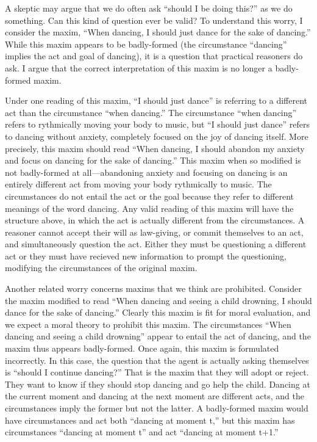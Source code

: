 \begin{isabellebody}
\begin{isamarkuptext}
A skeptic may argue that we do often ask ``should I be doing this?'' as we do something. 
Can this kind of question ever be valid? To understand this worry, I consider the maxim, 
``When dancing, I should just dance for the sake of dancing.'' While this maxim appears to be badly-formed (the 
circumstance ``dancing'' implies the act and goal of dancing), it is a question that practical reasoners 
do ask. I argue that the correct interpretation of this maxim is no longer a badly-formed maxim.

Under one reading of this maxim, ``I should just dance'' is referring to a different act than the 
circumstance ``when dancing.'' The circumstance ``when dancing'' refers 
to rythmically moving your body to music, but ``I should just dance'' refers to dancing without anxiety, 
completely focused on the joy of dancing itself. More precisely, this maxim should read ``When 
dancing, I should abandon my anxiety and focus on dancing for the sake of dancing.'' This maxim when so 
modified is not badly-formed at all—abandoning anxiety and focusing on dancing is an entirely different act 
from moving your body rythmically to music. The circumstances do not entail the act or the goal because 
they refer to different meanings of the word dancing. Any valid reading of this maxim will have the structure above, 
in which the act is actually different from the circumstances. A reasoner cannot accept their will 
as law-giving, or commit themselves to an act, and simultaneously question the act. Either they must be 
questioning a different act or they must have recieved new information to prompt the questioning, 
modifying the circumstances of the original maxim. 

Another related worry concerns maxims that we think are prohibited. Consider the maxim modified to 
read ``When dancing and seeing a child drowning, I should dance for the sake of dancing.'' Clearly this 
maxim is fit for moral evaluation, and we expect a moral theory to prohibit this maxim. The circumstances 
``When dancing and seeing a child drowning'' appear to entail the act of dancing, and the maxim thus 
appears badly-formed. Once again, this maxim is formulated incorrectly. In this case, the question 
that the agent is actually asking themselves is ``should I continue dancing?'' That is the 
maxim that they will adopt or reject. They want to know if they should stop dancing and go help the child. 
Dancing at the current moment and dancing at the next moment are different acts, and the circumstances 
imply the former but not the latter. A badly-formed maxim would have circumstances and act both 
``dancing at moment t,'' but this maxim has circumstances ``dancing at moment t'' and act ``dancing 
at moment t+1.''


\end{isamarkuptext}
\end{isabellebody}
